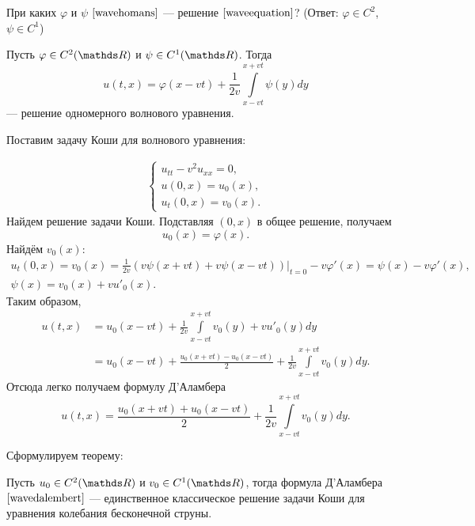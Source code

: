 \begin{exercise}
При каких $\varphi$ и $\psi$ $\eqref{wavehomans}$ --- решение $\eqref{waveequation}$? (Ответ: $\varphi \in C^2$, $\psi \in C^1$)
\end{exercise}

\begin{theorem} Пусть $\varphi \in C^2(\real)$ и $\psi \in C^1(\real)$. Тогда
$$ u(t, x) = \varphi (x - vt) + \frac {1} {2v} \int \limits_{x - vt}^{x+vt} \psi (y) dy$$
--- решение одномерного волнового уравнения.
\end{theorem}

Поставим задачу Коши для волнового уравнения:

\begin{align}
    \begin{cases} 
        u_{tt} - v^2 u_{xx} = 0, \\
        u (0, x) = u_0 (x), \\
        u_t(0,x) = v_0 (x).
    \end{cases}
\label{wavecauchy}
\end{align}
%
Найдем решение задачи Коши. Подставляя $(0,x)$ в общее решение, получаем $$ u_0(x) = \varphi(x) .$$ Найдём $v_0(x)$:
\begin{gather*}
	u_t(0,x) = v_0(x) = \frac {1} {2v} (v \psi (x + vt) + v \psi (x - vt)) \Bigg\rvert_{t = 0} - v \varphi' (x)
	= \psi(x) - v \varphi'(x), \\
	\psi(x) = v_0(x) + v u'_0(x).
\end{gather*}
Таким образом,
\begin{align*}
	u(t,x) &= u_0(x-vt) + \frac {1} {2v} \int \limits_{x-vt}^{x+vt} v_0(y) + vu'_0(y)dy \\
	&= u_0(x-vt) + \frac {u_0(x+vt) - u_0(x-vt)} { 2} + \frac {1} {2v} \int \limits_{x-vt}^{x+vt} v_0(y)dy.
\end{align*}
Отсюда легко получаем формулу Д'Аламбера
\begin{equation}
	u(t,x) = \frac {u_0(x+vt) + u_0(x-vt)} { 2} + \frac {1} {2v} \int \limits_{x-vt}^{x+vt} v_0(y)dy.
\label{wavedalembert}
\end{equation}

Сформулируем теорему:
\begin{theorem} Пусть $u_0 \in C^2(\real)$ и $v_0 \in C^1(\real)$, тогда формула Д'Аламбера $\eqref{wavedalembert}$ --- единственное классическое решение задачи Коши для уравнения колебания бесконечной струны.
\end{theorem}


